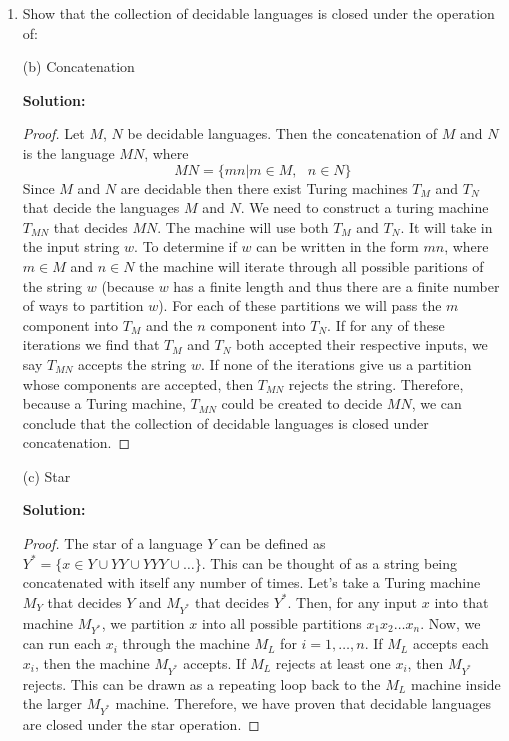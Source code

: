 \documentclass[11pt]{article}
\begin{document}
\begin{enumerate}
\item
Show that the collection of decidable languages is closed under the operation of:

(b) Concatenation

\textbf{Solution: }\begin{proof}
Let $M$, $N$ be decidable languages.  Then the concatenation of $M$ and $N$ is the language $MN$, where 
$$ MN = \{ mn | m \in M, \text{ } n \in N \} $$
Since $M$ and $N$ are decidable then there exist Turing machines $T_M$ and $T_N$ that decide the languages $M$ and $N$.  We need to construct a turing machine $T_{MN}$ that decides $MN$.  The machine will use both $T_M$ and $T_N$.  It will take in the input string $w$.  To determine if $w$ can be written in the form $mn$, where $m \in M$ and $n \in N$ the machine will iterate through all possible paritions of the string $w$ (because $w$ has a finite length and thus there are a finite number of ways to partition $w$).  For each of these partitions we will pass the $m$ component into $T_M$ and the $n$ component into $T_N$.  If for any of these iterations we find that $T_M$ and $T_N$ both accepted their respective inputs, we say $T_{MN}$ accepts the string $w$.  If none of the iterations give us a partition whose components are accepted, then $T_{MN}$ rejects the string.  Therefore, because a Turing machine, $T_{MN}$ could be created to decide $MN$, we can conclude that the collection of decidable languages is closed under concatenation.  
\end{proof}

(c) Star

\textbf{Solution: }\begin{proof}
The star of a language $Y$ can be defined as $ Y^* = \{ x \in Y \cup YY \cup YYY \cup \ldots \} $.  This can be thought of as a string being concatenated with itself any number of times.  Let's take a Turing machine $M_Y$ that decides $Y$ and $M_{Y^*}$ that decides $Y^*$.  
Then, for any input $x$ into that machine $M_{Y^*}$, we partition $x$ into all possible partitions $x_1 x_2 \ldots x_n$.  Now, we can run each $x_i$ through the machine $M_L$ for $i = 1, \ldots, n$.  If $M_L$ accepts each $x_i$, then the machine $M_{Y^*}$ accepts.  If $M_L$ rejects at least one $x_i$, then $M_{Y^*}$ rejects.  This can be drawn as a repeating loop back to the $M_L$ machine inside the larger $M_{Y^*}$ machine.  Therefore, we have proven that decidable languages are closed under the star operation.  
\end{proof}


\end{enumerate}
\end{document}
